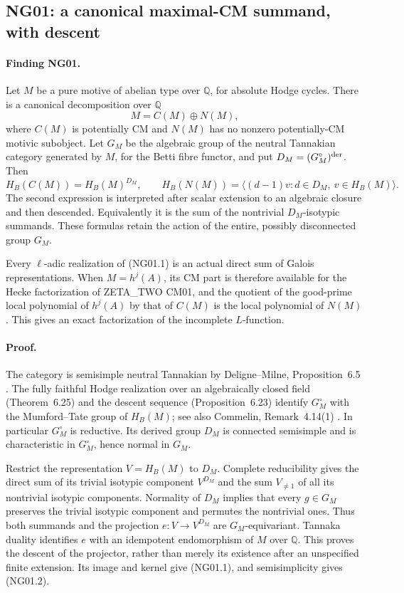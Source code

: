 \documentclass[11pt]{article}
\theoremstyle{remark}
\begin{document}
\subsection{NG01: a canonical maximal-CM summand, with descent}
\label{NG01}

\paragraph{Finding NG01.}
Let $M$ be a pure motive of abelian type over $\mathbb Q$, for absolute
Hodge cycles.  There is a canonical decomposition over $\mathbb Q$
\[
                    M=C(M)\oplus N(M),                         \tag{NG01.1}
\]
where $C(M)$ is potentially CM and $N(M)$ has no nonzero potentially-CM
motivic subobject.  Let $G_M$ be the algebraic group of the neutral
Tannakian category generated by $M$, for the Betti fibre functor, and put
$D_M=(G_M^\circ)^{\rm der}$.  Then
\[
 H_B(C(M))=H_B(M)^{D_M},\qquad
 H_B(N(M))=\langle (d-1)v:d\in D_M,\ v\in H_B(M)\rangle.       \tag{NG01.2}
\]
The second expression is interpreted after scalar extension to an
algebraic closure and then descended.  Equivalently it is the sum of the
nontrivial $D_M$-isotypic summands.  These formulas retain the action of
the entire, possibly disconnected group $G_M$.

Every $\ell$-adic realization of (NG01.1) is an actual direct sum of
Galois representations.  When $M=h^j(A)$, its CM part is therefore
available for the Hecke factorization of ZETA\_TWO CM01, and the quotient
of the good-prime local polynomial of $h^j(A)$ by that of $C(M)$ is the
local polynomial of $N(M)$.  This gives an exact factorization of the
incomplete $L$-function.

\paragraph{Proof.}
The category is semisimple neutral Tannakian by Deligne--Milne,
Proposition~6.5 \cite{NGDeligneMilne}.  The fully faithful Hodge realization over an
algebraically closed field (Theorem~6.25) and the descent sequence
(Proposition~6.23) identify $G_M^\circ$ with the Mumford--Tate group of
$H_B(M)$; see also Commelin, Remark~4.14(1) \cite{NGCommelin}.  In particular $G_M^\circ$
is reductive.  Its derived group $D_M$ is connected semisimple and is
characteristic in $G_M^\circ$, hence normal in $G_M$.

Restrict the representation $V=H_B(M)$ to $D_M$.  Complete reducibility
gives the direct sum of its trivial isotypic component $V^{D_M}$ and
the sum $V_{\ne1}$ of all its nontrivial isotypic components.  Normality
of $D_M$ implies that every $g\in G_M$ preserves the trivial isotypic
component and permutes the nontrivial ones.  Thus both summands and the
projection $e:V\to V^{D_M}$ are $G_M$-equivariant.  Tannaka duality
identifies $e$ with an idempotent endomorphism of $M$ over $\mathbb Q$.
This proves the descent of the projector, rather than merely its
existence after an unspecified finite extension.  Its image and kernel
give (NG01.1), and semisimplicity gives (NG01.2).
\end{document}
